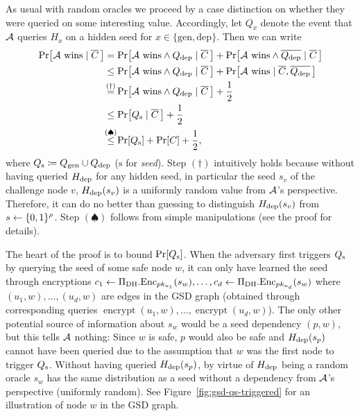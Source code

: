 As usual with random oracles we proceed by a case distinction on whether they were queried on some interesting value. Accordingly, let $Q_{x}$ denote the event that $\mathcal{A}$ queries $H_{x}$ on a hidden seed for $x \in \{\mathrm{gen}, \mathrm{dep}\}$. Then we can write
\begin{align} \label{eq:theorem-sd-gsd-security-win-cases}
	\begin{split}
		\pr{\wins \mid \overline{C} \,} & = \pr{\wins \land \qdep \mid \overline{C} \,} + \pr{\wins \land \overline{\qdep} \mid \overline{C} \,} \\
		& \le \pr{\wins \land \qdep \mid \overline{C} \,} + \pr{\wins \mid \overline{C}, \overline{\qdep} \,} \\
		& \stackrel{\mathclap{(\dagger)}}{=}  \pr{\wins \land \qdep \mid \overline{C} \,} + \frac{1}{2}         \\
		& \le \pr{\qs \mid \overline{C} \,} + \frac{1}{2} \\
		& \stackrel{\mathclap{(\spadesuit)}}{\le} \pr{\qs} + \pr{C} + \frac{1}{2},
	\end{split}
\end{align}
where $Q_\mathrm{s} \coloneqq Q_\mathrm{gen} \cup Q_\mathrm{dep}$ ($\mathrm{s}$ for \emph{seed}). Step $(\dagger)$ intuitively holds because without having queried $H_\mathrm{dep}$ for any hidden seed, in particular the seed $s_v$ of the challenge node $v$, $H_\mathrm{dep}(s_v)$ is a uniformly random value from $\mathcal{A}$'s perspective. Therefore, it can do no better than guessing to distinguish $H_\mathrm{dep}(s_v)$ from $s \leftarrow \{0, 1\}^\rho$.
Step $(\spadesuit)$ follows from simple manipulations (see the proof for details).

The heart of the proof is to bound $\pr{\qs}$. When the adversary first triggers $Q_\mathrm{s}$ by querying the seed of some safe node $w$, it can only have learned the seed through encryptions
$c_1 \leftarrow \Pi_{\mathrm{DH}}.\mathrm{Enc}_{pk_{u_1}}(s_w), \ldots, c_d \leftarrow \Pi_{\mathrm{DH}}.\mathrm{Enc}_{pk_{u_d}}(s_w)$
where $(u_1, w), \ldots, (u_d, w)$ are edges in the GSD graph (obtained through corresponding queries $\operatorname{encrypt}(u_1, w), \ldots, \operatorname{encrypt}(u_d, w)$). The only other potential source of information about $s_w$ would be a seed dependency $(p, w)$, but this tells $\mathcal{A}$ nothing: Since $w$ is safe, $p$ would also be safe and $H_\mathrm{dep}(s_p)$ cannot have been queried due to the assumption that $w$ was the first node to trigger $Q_\mathrm{s}$.
Without having queried $H_\mathrm{dep}(s_p)$, by virtue of $H_\mathrm{dep}$ being a random oracle $s_w$ has the same distribution as a seed without a dependency from $\mathcal{A}$'s perspective (uniformly random). See Figure~\ref{fig:gsd-qs-triggered} for an illustration of node $w$ in the GSD graph.

